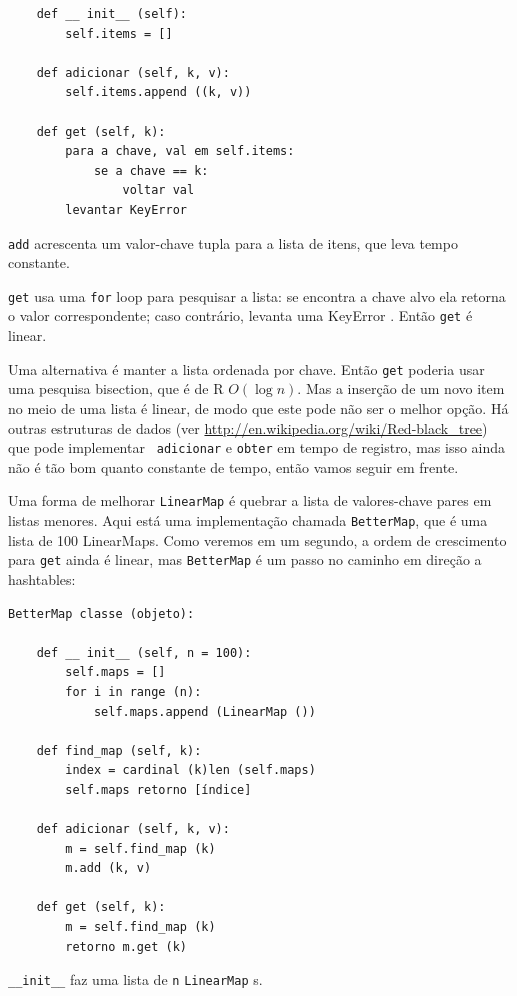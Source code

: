 \documentclass[10pt]{book}
\begin{document}
\begin{v erbatim}
\begin{verbatim}
    def __ init__ (self):
        self.items = []

    def adicionar (self, k, v):
        self.items.append ((k, v))

    def get (self, k):
        para a chave, val em self.items:
            se a chave == k:
                voltar val
        levantar KeyError
\end{verbatim}

{\tt add} acrescenta um valor-chave tupla para a lista de itens, que
leva tempo constante.

{\tt get} usa uma {\tt for} loop para pesquisar a lista:
se encontra a chave alvo ela retorna o valor correspondente;
caso contrário, levanta uma {KeyError \tt}.
Então {\tt get} é linear.

Uma alternativa é manter a lista ordenada por chave. Então {\tt get}
poderia usar uma pesquisa bisection, que é de R $ O (\log n) $. Mas a inserção de um
novo item no meio de uma lista é linear, de modo que este pode não ser o
melhor opção. Há outras estruturas de dados (ver
  \url{http://en.wikipedia.org/wiki/Red-black_tree}) que pode implementar {\tt
  adicionar} e {\tt obter} em tempo de registro, mas isso ainda não é tão bom quanto
constante de tempo, então vamos seguir em frente.

Uma forma de melhorar {\tt LinearMap} é quebrar a lista de valores-chave
pares em listas menores. Aqui está uma implementação chamada
{\tt BetterMap}, que é uma lista de 100 LinearMaps. Como veremos
em um segundo, a ordem de crescimento para {\tt get} ainda é linear,
mas {\tt BetterMap} é um passo no caminho em direção a hashtables:

\begin{verbatim}
BetterMap classe (objeto):

    def __ init__ (self, n = 100):
        self.maps = []
        for i in range (n):
            self.maps.append (LinearMap ())

    def find_map (self, k):
        index = cardinal (k)len (self.maps)
        self.maps retorno [índice]

    def adicionar (self, k, v):
        m = self.find_map (k)
        m.add (k, v)

    def get (self, k):
        m = self.find_map (k)
        retorno m.get (k)
\end{verbatim}

\Verb "__init__" faz uma lista de {\tt n} {\tt LinearMap} s.


\end{v erbatim}
\end{document}
